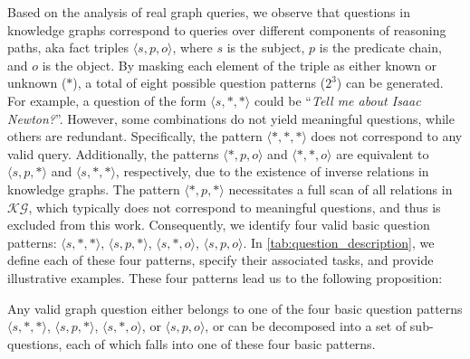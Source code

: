  Based on the analysis of real graph queries, we observe that questions in knowledge graphs correspond to queries over different components of reasoning paths, aka fact triples $\langle s, p, o \rangle$, where $s$ is the subject, $p$ is the predicate chain, and $o$ is the object. By masking each element of the triple as either known or unknown ($*$), a total of eight possible question patterns ($2^3$) can be generated. For example, a question of the form $\langle s, *, * \rangle$ could be ``\textit{Tell me about Isaac Newton?}''. However, some combinations do not yield meaningful questions, while others are redundant. Specifically, the pattern $\langle *, *, * \rangle$ does not correspond to any valid query. Additionally, the patterns $\langle *, p, o \rangle$ and $\langle *, *, o \rangle$ are equivalent to $\langle s, p, * \rangle$ and $\langle s, *, * \rangle$, respectively, due to the existence of inverse relations in knowledge graphs. The pattern $\langle *, p, * \rangle$ necessitates a full scan of all relations in $\mathcal{KG}$, which typically does not correspond to meaningful questions, and thus is excluded from this work. Consequently, we identify four valid basic question patterns: $\langle s, *, * \rangle$, $\langle s, p, * \rangle$, $\langle s, *, o \rangle$, $\langle s, p, o \rangle$. In \autoref{tab:question_description}, we define each of these four patterns, specify their associated tasks, and provide illustrative examples. These four patterns lead us to the following proposition:

\begin{proposition}
\label{pro:taxonomy}
Any valid graph question either belongs to one of the four basic question patterns 
$\langle s, *, * \rangle$, $\langle s, p, * \rangle$, $\langle s, *, o \rangle$, or 
$\langle s, p, o \rangle$, or can be decomposed into a set of sub-questions, each of 
which falls into one of these four basic patterns.
\end{proposition}

